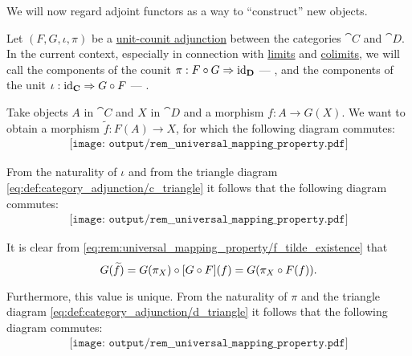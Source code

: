 \begin{remark}\label{rem:universal_mapping_property}
  We will now regard adjoint functors as a way to \enquote{construct} new objects.

  Let \( (F, G, \iota, \pi) \) be a \hyperref[def:category_adjunction/unit_counit]{unit-counit adjunction} between the categories \( \cat{C} \) and \( \cat{D} \). In the current context, especially in connection with \hyperref[def:category_of_cones/limit]{limits} and \hyperref[def:category_of_cones/colimit]{colimits}, we will call the components of the counit \( \pi: F \bincirc G \Rightarrow \id_{\cat{D}} \) --- , and the components of the unit \( \iota: \id_{\cat{C}} \Rightarrow G \bincirc F \) --- .

  Take objects \( A \) in \( \cat{C} \) and \( X \) in \( \cat{D} \) and a morphism \( f: A \to G(X) \). We want to obtain a morphism \( \widetilde{f}: F(A) \to X \), for which the following diagram commutes:
  \begin{equation}\label{eq:rem:universal_mapping_property/c_triangle}
    \begin{aligned}
      \texttt{[image: output/rem\_\_universal\_mapping\_property.pdf]}
    \end{aligned}
  \end{equation}

  From the naturality of \( \iota \) and from the triangle diagram \eqref{eq:def:category_adjunction/c_triangle} it follows that the following diagram commutes:
  \begin{equation}\label{eq:rem:universal_mapping_property/f_tilde_existence}
    \begin{aligned}
      \texttt{[image: output/rem\_\_universal\_mapping\_property.pdf]}
    \end{aligned}
  \end{equation}

  It is clear from \eqref{eq:rem:universal_mapping_property/f_tilde_existence} that
  \begin{equation*}
    G(\widetilde{f}) = G(\pi_X) \bincirc [G \bincirc F](f) = G(\pi_X \bincirc F(f)).
  \end{equation*}

  Furthermore, this value is unique. From the naturality of \( \pi \) and the triangle diagram \eqref{eq:def:category_adjunction/d_triangle} it follows that the following diagram commutes:
  \begin{equation}\label{eq:rem:universal_mapping_property/f_tilde_uniquness}
    \begin{aligned}
      \texttt{[image: output/rem\_\_universal\_mapping\_property.pdf]}
    \end{aligned}
  \end{equation}


\end{remark}
